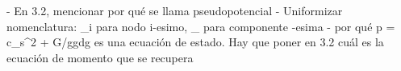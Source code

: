 - En 3.2, mencionar por qu\'e se llama pseudopotencial
- Uniformizar nomenclatura: _i para nodo i-esimo, _{\alpha} para componente {\alpha-}esima
- por qu\'e p = \rho c_s^2 + G/ggdg es una ecuaci\'on de estado. Hay que poner en 3.2 cu\'al es la ecuaci\'on de momento que se recupera